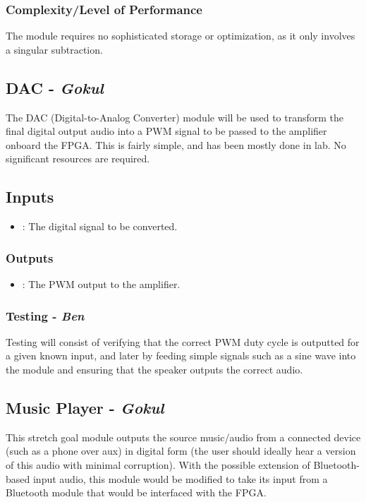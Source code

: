 \documentclass{fpgairpods}
\begin{document}
\begin{multicols*}{2}
\subsubsection{Complexity/Level of Performance}
The module requires no sophisticated storage or optimization, as it only involves a singular subtraction. 


\subsection{DAC - \textit{Gokul}}
The DAC (Digital-to-Analog Converter) module will be used to transform the final digital output audio into a PWM signal to be passed to the amplifier onboard the FPGA. This is fairly simple, and has been mostly done in lab. No significant resources are required.
\subsection{Inputs}
\begin{itemize}
    \item {}: The digital signal to be converted.
\end{itemize}
\subsubsection{Outputs}
\begin{itemize}
    \item {}: The PWM output to the amplifier.
\end{itemize}
\subsubsection{Testing - \textit{Ben}}
Testing will consist of verifying that the correct PWM duty cycle is outputted for a given known input, and later by feeding simple signals such as a sine wave into the module and ensuring that the speaker outputs the correct audio.

\subsection{Music Player - \textit{Gokul}}
This stretch goal module outputs the source music/audio from a connected device (such as a phone over aux) in digital form (the user should ideally hear a version of this audio with minimal corruption). With the possible extension of Bluetooth-based input audio, this module would be modified to take its input from a Bluetooth module that would be interfaced with the FPGA.

\end{multicols*}
\end{document}
